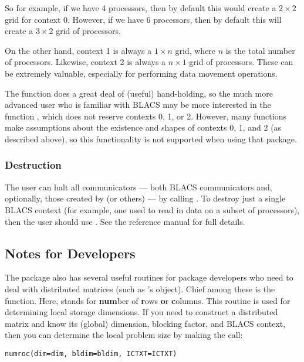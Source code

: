 So for example, if we have 4 processors, then by default this would create a $2\times 2$ grid for context 0.  However, if we have 6 processors, then by default this will create a $3\times 2$ grid of processors.

On the other hand, context 1 is always a $1\times n$ grid, where $n$ is the total number of processors.  Likewise, context 2 is always a $n\times 1$ grid of processors.  These can be extremely valuable, especially for performing data movement operations.

The function  does a great deal of (useful) hand-holding, so the much more advanced user who is familiar with BLACS may be more interested in the function , which does not reserve contexts 0, 1, or 2.  However, many  functions make assumptions about the existence and shapes of contexts 0, 1, and 2 (as described above), so this functionality is not supported when using that package.

\subsubsection{Destruction}

The user can halt all communicators --- both BLACS communicators and, optionally, those created by  (or others) --- by calling .  To destroy just a single BLACS context (for example, one used to read in data on a subset of processors), then the user should use .  See the  reference manual for full details.



\subsection{Notes for Developers}

The  package also has several useful routines for package developers who need to deal with distributed matrices (such as 's  object).  Chief among these is the  function.  Here,  stands for \textbf{num}ber of \textbf{r}ows \textbf{o}r \textbf{c}olumns.  This routine is used for determining local storage dimensions.  If you need to construct a distributed matrix and know its (global) dimension, blocking factor, and BLACS context, then you can determine the local problem size by making the call:

\begin{lstlisting}[language=rr]
numroc(dim=dim, bldim=bldim, ICTXT=ICTXT)
\end{lstlisting}

